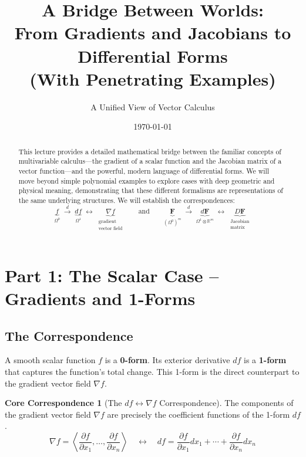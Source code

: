 \documentclass[12pt, letterpaper]{article}
\title{\bfseries A Bridge Between Worlds: \\ \large From Gradients and Jacobians to Differential Forms \\ \Large (With Penetrating Examples)}
\author{A Unified View of Vector Calculus}
\date{\today}
\theoremstyle{definition}
\newtheorem{idea}{Core Correspondence}[section]
\newcommand{\R}{\mathbb{R}}
\begin{document}
	\maketitle
	
	\begin{abstract}
		This lecture provides a detailed mathematical bridge between the familiar concepts of multivariable calculus—the gradient of a scalar function and the Jacobian matrix of a vector function—and the powerful, modern language of differential forms. We will move beyond simple polynomial examples to explore cases with deep geometric and physical meaning, demonstrating that these different formalisms are representations of the same underlying structures. We will establish the correspondences:
		\[
		\underbrace{f}_{\Omega^0}
		\;\xrightarrow{d}\;
		\underbrace{df}_{\Omega^1}
		\;\longleftrightarrow\;
		\underbrace{\nabla f}_{\substack{\text{gradient}\\\text{vector field}}}
		\qquad \text{and} \qquad
		\underbrace{\mathbf F}_{(\Omega^0)^m}
		\;\xrightarrow{d}\;
		\underbrace{d\mathbf F}_{\Omega^1\otimes\R^m}
		\;\longleftrightarrow\;
		\underbrace{D\mathbf F}_{\substack{\text{Jacobian}\\\text{matrix}}}
		\]
	\end{abstract}
	
	\section{Part 1: The Scalar Case -- Gradients and 1-Forms}
	
	\subsection{The Correspondence}
	A smooth scalar function $f$ is a \textbf{0-form}. Its exterior derivative $df$ is a \textbf{1-form} that captures the function's total change. This 1-form is the direct counterpart to the gradient vector field $\nabla f$.
	
	\begin{idea}[The $df \longleftrightarrow \nabla f$ Correspondence]
		The components of the gradient vector field $\nabla f$ are precisely the coefficient functions of the 1-form $df$.
		\begin{equation*}
			\nabla f = \left\langle \frac{\partial f}{\partial x_1}, \dots, \frac{\partial f}{\partial x_n} \right\rangle
			\quad\longleftrightarrow\quad
			df = \frac{\partial f}{\partial x_1} dx_1 + \cdots + \frac{\partial f}{\partial x_n} dx_n
		\end{equation*}
	\end{idea}
	
\end{document}
